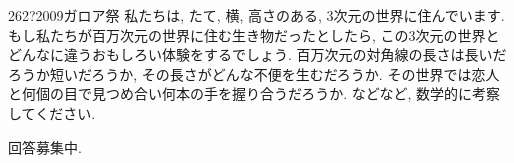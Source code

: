 \begin{thm}{262}{\hosi ?}{2009ガロア祭}
私たちは, たて, 横, 高さのある, 3次元の世界に住んでいます. もし私たちが百万次元の世界に住む生き物だったとしたら, この3次元の世界とどんなに違うおもしろい体験をするでしょう. 百万次元の対角線の長さは長いだろうか短いだろうか, その長さがどんな不便を生むだろうか. その世界では恋人と何個の目で見つめ合い何本の手を握り合うだろうか. などなど, 数学的に考察してください.
\end{thm}

回答募集中. 
